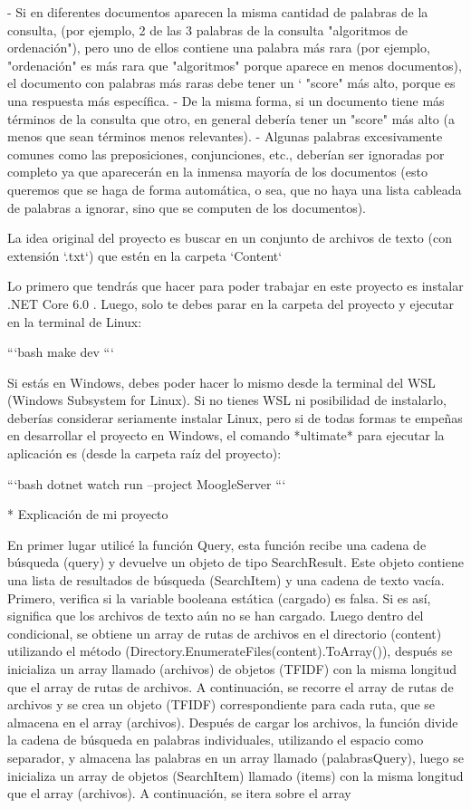 \documentclass{beamer}
\begin{document}
\begin{frame}

- Si en diferentes documentos aparecen la misma cantidad de palabras de la consulta, (por ejemplo, 2 de las 3 palabras de la consulta "algoritmos de ordenación"), pero uno de ellos contiene una palabra más rara (por ejemplo, "ordenación" es más rara que "algoritmos" porque aparece en menos documentos), el documento con palabras más raras debe tener un `
"score" más alto, porque es una respuesta más específica.
- De la misma forma, si un documento tiene más términos de la consulta que otro, en general debería tener un "score" más alto (a menos que sean términos menos relevantes).
- Algunas palabras excesivamente comunes como las preposiciones, conjunciones, etc., deberían ser ignoradas por completo ya que aparecerán en la inmensa mayoría de los documentos (esto queremos que se haga de forma automática, o sea, que no haya una lista cableada de palabras a ignorar, sino que se computen de los documentos).

La idea original del proyecto es buscar en un conjunto de archivos de texto (con extensión `.txt`) que estén en la carpeta `Content`


Lo primero que tendrás que hacer para poder trabajar en este proyecto es instalar .NET Core 6.0 . Luego, solo te debes parar en la carpeta del proyecto y ejecutar en la terminal de Linux:

```bash
make dev
```

Si estás en Windows, debes poder hacer lo mismo desde la terminal del WSL (Windows Subsystem for Linux). Si no tienes WSL ni posibilidad de instalarlo, deberías considerar seriamente instalar Linux, pero si de todas formas te empeñas en desarrollar el proyecto en Windows, el comando *ultimate* para ejecutar la aplicación es (desde la carpeta raíz del proyecto):

```bash
dotnet watch run --project MoogleServer
```
\end{frame}
\begin{frame}
 * Explicación de mi proyecto


En primer lugar utilicé la función Query, esta función recibe una cadena de búsqueda (query) y devuelve un objeto de tipo SearchResult. Este objeto contiene una lista de resultados de búsqueda (SearchItem) y una cadena de texto vacía.  Primero, verifica si la variable booleana estática (cargado) es falsa. Si es así, significa que los archivos de texto aún no se han cargado. Luego dentro del condicional, se obtiene un array de rutas de archivos en el directorio (content) utilizando el método (Directory.EnumerateFiles(content).ToArray()), después se inicializa un array llamado (archivos) de objetos (TFIDF) con la misma longitud que el array de rutas de archivos.  A continuación, se recorre el array de rutas de archivos y se crea un objeto (TFIDF) correspondiente para cada ruta, que se almacena en el array (archivos).  Después de cargar los archivos, la función divide la cadena de búsqueda en palabras individuales, utilizando el espacio como 
separador, y almacena las palabras en un array llamado (palabrasQuery), luego se inicializa un array de objetos 
(SearchItem) llamado (items) con la misma longitud que el array (archivos).  A continuación, se itera sobre el array 
\end{frame}
\end{document}
